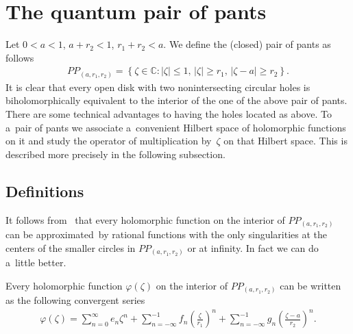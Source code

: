 \section{The quantum pair of pants}\label{section3}

Let $0<a<1$, $a+r_2<1$, $r_1+r_2<a$.
We def\/ine the (closed) pair of pants as follows
\begin{gather*}
PP_{(a, r_1,r_2)}= \left\{\zeta\in{\mathbb C}: |\zeta| \leq 1,\, |\zeta|\geq r_1,\, |\zeta-a|\geq r_2\right\}.
\end{gather*}
It is clear that every open disk with two nonintersecting circular holes is biholomorphically equivalent to the interior
of the one of the above pair of pants.
There are some technical advantages to having the holes located as above.
To a~pair of pants we associate a~convenient Hilbert space of holomorphic functions on it and study the operator of
multiplication by~$\zeta$ on that Hilbert space.
This is described more precisely in the following subsection.

\subsection{Definitions}

It follows from~\cite{M} that every holomorphic function on the interior of $PP_{(a, r_1,r_2)}$ can be appro\-xi\-ma\-ted~by
rational functions with the only singularities at the centers of the smaller circles in $PP_{(a, r_1,r_2)}$ or at
inf\/inity.
In fact we can do a~little better.

\begin{Proposition}
Every holomorphic function $\varphi(\zeta)$ on the interior of $PP_{(a, r_1,r_2)}$ can be written as the following
convergent series
\begin{gather*}
\varphi(\zeta)=\sum\limits_{n=0}^\infty e_n\zeta^n+\sum\limits_{n=-\infty}^{-1} f_n\left(\frac{\zeta}{r_1}\right)^n
+ \sum\limits_{n=-\infty}^{-1} g_n\left(\frac{\zeta-a}{r_2}\right)^n.
\end{gather*}
\end{Proposition}

